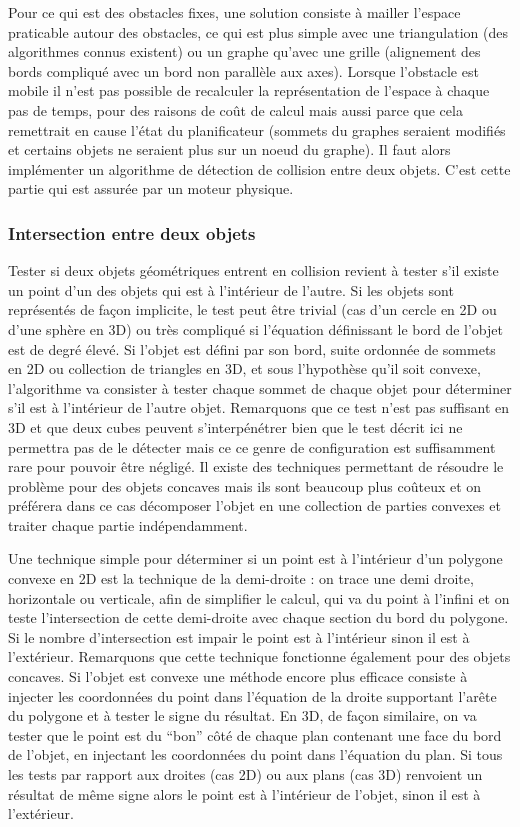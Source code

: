 \documentclass{article}
\begin{document}
Pour ce qui est des obstacles fixes, une solution consiste à mailler l’espace praticable autour des obstacles, ce qui est plus simple avec une triangulation (des algorithmes connus existent) ou un graphe qu’avec une grille (alignement des bords compliqué avec un bord non parallèle aux axes). Lorsque l’obstacle est mobile il n’est pas possible de recalculer la représentation de l’espace à chaque pas de temps, pour des raisons de coût de calcul mais aussi parce que cela remettrait en cause l’état du planificateur (sommets du graphes seraient modifiés et certains objets ne seraient plus sur un noeud du graphe). Il faut alors implémenter un algorithme de détection de collision entre deux objets. C’est cette partie qui est assurée par un moteur physique.

\subsubsection{Intersection entre deux objets}
\label{inter}
Tester si deux objets géométriques entrent en collision revient à tester s’il existe un point d’un des objets qui est à l’intérieur de l’autre. Si les objets sont représentés de façon implicite, le test peut être trivial (cas d’un cercle en 2D ou d’une sphère en 3D) ou très compliqué si l’équation définissant le bord de l’objet est de degré élevé. Si l’objet est défini par son bord, suite ordonnée de sommets en 2D ou collection de triangles en 3D, et sous l’hypothèse qu’il soit convexe, l’algorithme va consister à tester chaque sommet de chaque objet pour déterminer s’il est à l’intérieur de l’autre objet. Remarquons que ce test n’est pas suffisant en 3D et que deux cubes peuvent s’interpénétrer bien que le test décrit ici ne permettra pas de le détecter mais ce ce genre de configuration est suffisamment rare pour pouvoir être négligé. Il existe des techniques permettant de résoudre le problème pour des objets concaves mais ils sont beaucoup plus coûteux et on préférera dans ce cas décomposer l’objet en une collection de parties convexes et traiter chaque partie indépendamment.

Une technique simple pour déterminer si un point est à l’intérieur d’un polygone convexe en 2D est la technique de la demi-droite : on trace une demi droite, horizontale ou verticale, afin de simplifier le calcul, qui va du point à l’infini et on teste l’intersection de cette demi-droite avec chaque section du bord du polygone. Si le nombre d’intersection est impair le point est à l’intérieur sinon il est à l’extérieur. Remarquons que cette technique fonctionne également pour des objets concaves. Si l’objet est convexe une méthode encore plus efficace consiste à injecter les coordonnées du point dans l’équation de la droite supportant l’arête du polygone et à tester le signe du résultat. En 3D, de façon similaire,  on va tester que le point est du “bon” côté de chaque plan contenant une face du bord de l’objet, en injectant les coordonnées du point dans l’équation du plan. Si tous les tests par rapport aux droites (cas 2D) ou aux plans (cas 3D) renvoient un résultat de même signe alors le point est à l’intérieur de l’objet, sinon il est à l’extérieur.
\end{document}
